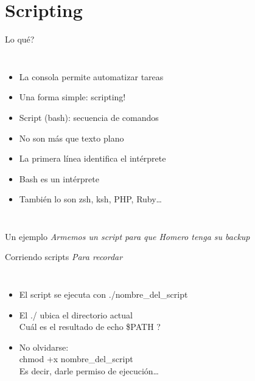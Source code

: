\section{Scripting}


\begin{frame}{Lo qu\'e?}
\begin{columns}[onlytextwidth]
	\begin{itemize}
		\item La consola permite automatizar tareas
		\item Una forma simple: scripting!
		\item Script (bash): secuencia de comandos
		\item No son m\'as que texto plano
		\item La primera l\'inea identifica el int\'erprete
		\item Bash es un int\'erprete
		\item Tambi\'en lo son zsh, ksh, PHP, Ruby\ldots
	\end{itemize}
\end{columns}
\end{frame}



\begin{frame}[t]{Un ejemplo}
\textit{ Armemos un script para que Homero tenga su backup }
\only<1>{  }
\only<2>{  }
\end{frame}



\begin{frame}{Corriendo scripts}
\textit{Para recordar}
\begin{columns}[onlytextwidth]
	\begin{itemize}
		\item El script se ejecuta con ./nombre\_del\_script
		\item El ./ ubica el directorio actual \\
		        \textquestiondown Cu\'al es el resultado de echo \$PATH ?
		\item No olvidarse: \\ \alert{ chmod +x nombre\_del\_script} \\
	           Es decir, darle permiso de ejecuci\'on\ldots
	\end{itemize}
\end{columns}
\end{frame}




